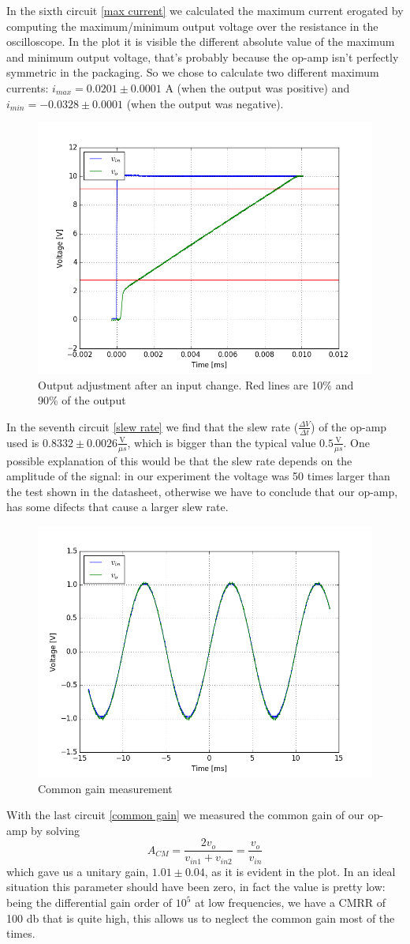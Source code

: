 In the sixth circuit \eqref{max current} we calculated the maximum current erogated by computing the maximum/minimum output voltage over the resistance in the oscilloscope. In the plot it is visible the different absolute value of the maximum and minimum output voltage, that's probably because the op-amp isn't perfectly symmetric in the packaging. So we chose to calculate two different maximum currents: $i_{max} = 0.0201 \pm 0.0001$ A (when the output was positive) and $i_{min} = -0.0328 \pm 0.0001$ (when the output was negative).
\begin{figure}[H]
\centering
\includegraphics[width=.6\textwidth]{3/Slew_Ratio.png}
\caption{Output adjustment after an input change. Red lines are 10\% and 90\% of the output}
\end{figure}
In the seventh circuit \eqref{slew rate} we find that the slew rate ($\frac{\Delta V}{\Delta t}$) of the op-amp used is $0.8332 \pm 0.0026 \frac{\text{V}}{\mu s}$, which is bigger than the typical value $0.5 \frac{\text{V}}{\mu s}$. One possible explanation of this would be that the slew rate depends on the amplitude of the signal: in our experiment the voltage was 50 times larger than the test shown in the datasheet, otherwise we have to conclude that our op-amp, has some difects that cause a larger slew rate.
\begin{figure}[H]
\centering
\includegraphics[width=.7\textwidth]{3/Amplification_in_common_mode.png}
\caption{Common gain measurement}
\end{figure}
With the last circuit \eqref{common gain} we measured the common gain of our op-amp by solving
\[A_{CM} = \frac{2 v_{o}}{v_{in1} + v_{in2}} = \frac{v_o}{v_{in}}\]
which gave us a unitary gain, $1.01 \pm 0.04 $, as it is evident in the plot. In an ideal situation this parameter should have been zero, in fact the value is pretty low: being the differential gain order of $10^5$ at low frequencies, we have a CMRR of 100 db that is quite high, this allows us to neglect the common gain most of the times.

